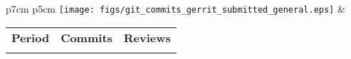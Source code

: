 \begin{tabular}{p{7cm} p{5cm}}
	\vspace{0pt} 
	\texttt{[image: figs/git\_commits\_gerrit\_submitted\_general.eps]}
	& 
	\vspace{0pt}
	\begin{tabular}{l|r|r|}
		\bfseries Period & \bfseries Commits & \bfseries Reviews
		\csvreader[head to column names]{data/git_commits_gerrit_submitted_general.csv}{}
		{\\ & \commits & \submitted}
	\end{tabular}
\end{tabular}
